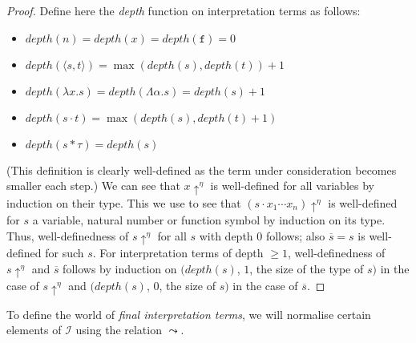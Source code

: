 \documentclass[runningheads,a4paper]{llncs}
\newcommand{\Iterms}{\mathcal{I}}
\newcommand{\abs}[2]{\lambda #1.#2}
\newcommand{\tabs}[2]{\Lambda #1.#2}
\newcommand{\app}[2]{#1 \cdot #2}
\newcommand{\apps}[3]{#1 \cdot #2 \cdots #3}
\newcommand{\tapp}[2]{#1 * #2}
\newcommand{\pair}[2]{\langle #1,#2 \rangle}
\newcommand{\etalong}[1]{#1\uparrow^\eta}
\newcommand{\almostetalong}[1]{\overline{#1}}
\begin{document}
\begin{proof}
Define here the \emph{depth} function on interpretation terms as
follows:
\begin{itemize}
\item $\mathit{depth}(n) = \mathit{depth}(x) = \mathit{depth}(\mathtt{f})
  = 0$
\item $\mathit{depth}(\pair{s}{t}) = \max(\mathit{depth}(s),\mathit{
  depth}(t)) + 1$
\item $\mathit{depth}(\abs{x}{s}) = \mathit{depth}(\tabs{\alpha}{s}) =
  \mathit{depth}(s) + 1$
\item $\mathit{depth}(\app{s}{t}) = \max(\mathit{depth}(s),\mathit{
  depth}(t)+1)$
\item $\mathit{depth}(\tapp{s}{\tau}) = \mathit{depth}(s)$
\end{itemize}
(This definition is clearly well-defined as the term under consideration
becomes smaller each step.)
We can see that $\etalong{x}$ is well-defined for all variables by
induction on their type.  This we use to see that $\etalong{(\apps{s}{
x_1}{x_n})}$ is well-defined for $s$ a variable, natural number or
function symbol by induction on its type.  Thus, well-definedness of
$\etalong{s}$ for all $s$ with depth $0$ follows; also $\almostetalong{
s} = s$ is well-defined for such $s$.
For interpretation terms of depth $\geq 1$, well-definedness of
$\etalong{s}$ and $\overline{s}$ follows by induction on
$(\mathit{depth}(s)$, $1$, the size of the type of $s)$ in the case
of $\etalong{s}$ and
$(\mathit{depth}(s)$, $0$, the size of $s)$ in the case of
$\almostetalong{s}$.
\end{proof}

To define the world of \emph{final interpretation terms}, we will
normalise certain elements of $\Iterms$ using the relation $\leadsto$.
\end{document}
